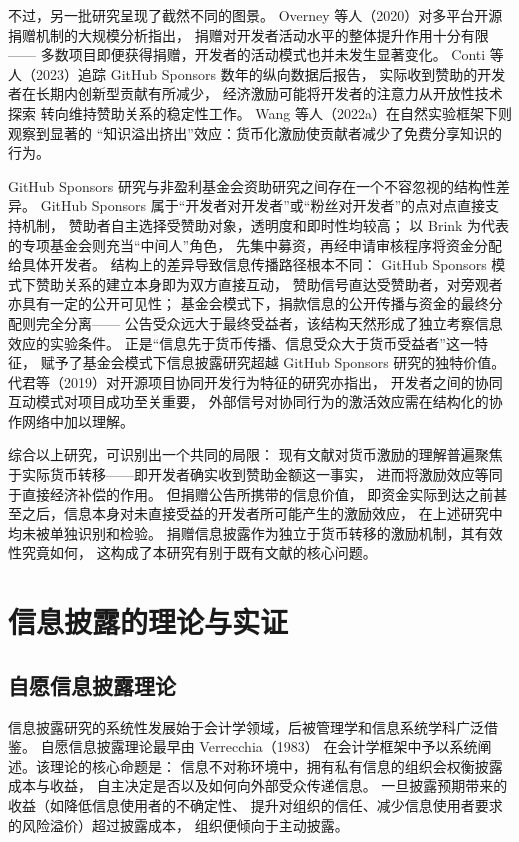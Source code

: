 不过，另一批研究呈现了截然不同的图景。
Overney 等人（2020）对多平台开源捐赠机制的大规模分析指出，
捐赠对开发者活动水平的整体提升作用十分有限——
多数项目即便获得捐赠，开发者的活动模式也并未发生显著变化\cite{overney2020not}。
Conti 等人（2023）追踪 GitHub Sponsors 数年的纵向数据后报告，
实际收到赞助的开发者在长期内创新型贡献有所减少，
经济激励可能将开发者的注意力从开放性技术探索
转向维持赞助关系的稳定性工作\cite{conti2023incentivizing}。
Wang 等人（2022a）在自然实验框架下则观察到显著的
“知识溢出挤出”效应：货币化激励使贡献者减少了免费分享知识的行为\cite{wang2022monetary}。

GitHub Sponsors 研究与非盈利基金会资助研究之间存在一个不容忽视的结构性差异。
GitHub Sponsors 属于“开发者对开发者”或“粉丝对开发者”的点对点直接支持机制，
赞助者自主选择受赞助对象，透明度和即时性均较高；
以 Brink 为代表的专项基金会则充当“中间人”角色，
先集中募资，再经申请审核程序将资金分配给具体开发者。
结构上的差异导致信息传播路径根本不同：
GitHub Sponsors 模式下赞助关系的建立本身即为双方直接互动，
赞助信号直达受赞助者，对旁观者亦具有一定的公开可见性；
基金会模式下，捐款信息的公开传播与资金的最终分配则完全分离——
公告受众远大于最终受益者，该结构天然形成了独立考察信息效应的实验条件。
正是“信息先于货币传播、信息受众大于货币受益者”这一特征，
赋予了基金会模式下信息披露研究超越 GitHub Sponsors 研究的独特价值。
代君等（2019）对开源项目协同开发行为特征的研究亦指出，
开发者之间的协同互动模式对项目成功至关重要，
外部信号对协同行为的激活效应需在结构化的协作网络中加以理解\cite{dai2019collaborative}。

综合以上研究，可识别出一个共同的局限：
现有文献对货币激励的理解普遍聚焦于实际货币转移——即开发者确实收到赞助金额这一事实，
进而将激励效应等同于直接经济补偿的作用。
但捐赠公告所携带的信息价值，
即资金实际到达之前甚至之后，信息本身对未直接受益的开发者所可能产生的激励效应，
在上述研究中均未被单独识别和检验。
捐赠信息披露作为独立于货币转移的激励机制，其有效性究竟如何，
这构成了本研究有别于既有文献的核心问题。

\section{信息披露的理论与实证}

\subsection{自愿信息披露理论}

信息披露研究的系统性发展始于会计学领域，后被管理学和信息系统学科广泛借鉴。
自愿信息披露理论最早由 Verrecchia（1983）
在会计学框架中予以系统阐述\cite{verrecchia1983discretionary}。该理论的核心命题是：
信息不对称环境中，拥有私有信息的组织会权衡披露成本与收益，
自主决定是否以及如何向外部受众传递信息。
一旦披露预期带来的收益（如降低信息使用者的不确定性、
提升对组织的信任、减少信息使用者要求的风险溢价）超过披露成本，
组织便倾向于主动披露\cite{verrecchia1983discretionary}。

